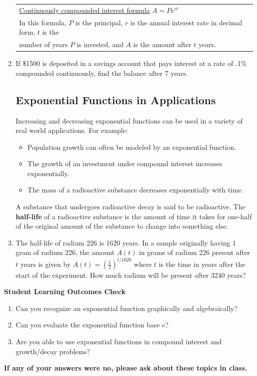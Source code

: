 \begin{enumerate}
 \hspace{-.3in} \begin{tabular}{| l |} \hline
\underline{Continuously compounded interest formula} $A = Pe^{rt}$ \\
In this formula, $P$ is the principal, $r$ is the annual interest rate in decimal form, 
$t$ is the\\ number of years $P$ is invested, and
$A$ is the amount after $t$ years.   \\ \hline
\end{tabular}


\item If \$1500 is deposited in a savings account that pays interest at a rate of .1\% compounded continuously, find the balance after 7 years. \\[1in]


\newpage

\subsection{Exponential Functions in Applications} 
Increasing and decreasing exponential functions can be used in a
variety of real world applications.  For example:
\begin{itemize}
\item Population growth can often be modeled by an exponential function.
\item The growth of an investment under compound interest increases exponentially.
\item The mass of a radioactive substance decreases exponentially with time.
\end{itemize}

\noindent A substance that undergoes radioactive decay is said to be radioactive.  The \textbf{half-life} of a radioactive substance is the amount of time it takes for one-half of the original amount of the substance to change into something else.

\item The half-life of radium 226 is 1620 years.  In a sample originally having 1 gram of radium 226, the amount $A(t)$ in grams of radium 226 present after $t$ years is given by $\displaystyle A(t)=(\frac{1}{2})^{t/1620}$ where $t$ is the time in years after the start of the experiment.  How much radium will be present after 3240 years? 
\vfill


\end{enumerate}

\noindent \textbf{Student Learning Outcomes Check}

\begin{enumerate}
\item Can you recognize an exponential function graphically and algebraically?
\item Can you evaluate the exponential function base $e$?
\item Are you able to use exponential functions in compound interest and growth/decay problems?

\end{enumerate}

\noindent \textbf{If any of your answers were no, please ask about these topics in class.}

